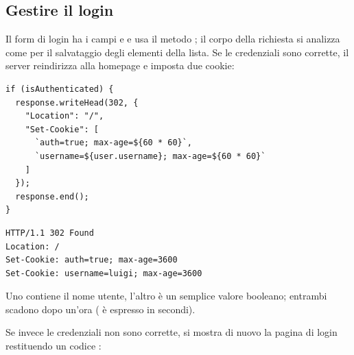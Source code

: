 \subsection{Gestire il login}

Il form di login ha i campi  e  e usa il metodo
; il corpo della richiesta si analizza come per il salvataggio degli
elementi della lista. Se le credenziali sono corrette, il server reindirizza
alla homepage e imposta due cookie:

\begin{affianco}[0.5][c]
\begin{lstlisting}[style=js, name=login.js]
if (isAuthenticated) {
  response.writeHead(302, {
    "Location": "/",
    "Set-Cookie": [
      `auth=true; max-age=${60 * 60}`,
      `username=${user.username}; max-age=${60 * 60}`
    ]
  });
  response.end();
}
\end{lstlisting}
\risultato
\begin{lstlisting}[style=http, name=Risposta generata]
HTTP/1.1 302 Found
Location: /
Set-Cookie: auth=true; max-age=3600
Set-Cookie: username=luigi; max-age=3600
\end{lstlisting}
\end{affianco}

Uno contiene il nome utente, l'altro è un semplice valore booleano; entrambi
scadono dopo un'ora ( è espresso in secondi).


Se invece le credenziali non sono corrette, si mostra di nuovo la pagina di
login restituendo un codice :

